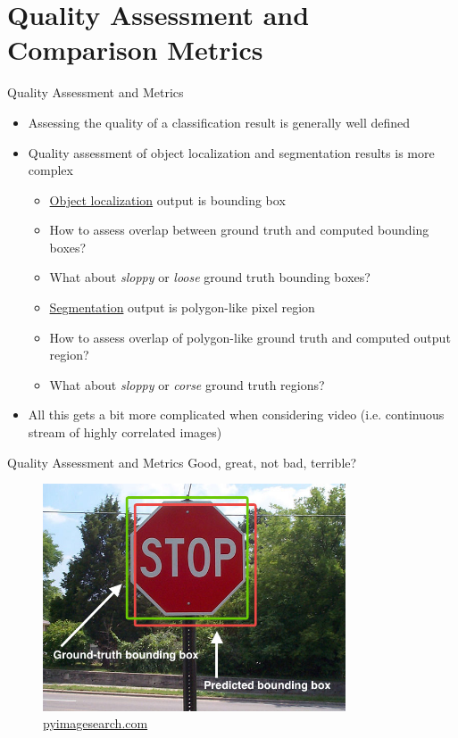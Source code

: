 \documentclass[handout]{beamer}
\begin{document}
\section{Quality Assessment and Comparison Metrics}
\begin{frame}{Quality Assessment and Metrics}
\begin{itemize}
\itemsep 1.25em
	\item<1->Assessing the quality of a classification result is generally well defined
	\item<2->Quality assessment of object localization and segmentation results is more complex
	\begin{itemize}[square]
		\item<1->\underline{Object localization} output is bounding box
		\item<2->How to assess overlap between ground truth and computed bounding boxes?
		\item<3->What about \emph{sloppy} or \emph{loose} ground truth bounding boxes?
	\end{itemize}
	
	\begin{itemize}[square]
		\item<4->\underline{Segmentation} output is polygon-like pixel region
		\item<5->How to assess overlap of polygon-like ground truth and computed output region?
		\item<6->What about \emph{sloppy} or \emph{corse} ground truth regions?
	\end{itemize}
	\item<3->All this gets a bit more complicated when considering video (i.e. continuous stream of highly correlated images)
\end{itemize}
\end{frame}

\begin{frame}{Quality Assessment and Metrics}
Good, great, not bad, terrible?
\begin{figure}
\centering
\includegraphics[width=0.8\textwidth]{../media/iou_stop_sign.jpg}
\caption{\href{http://www.pyimagesearch.com/2016/11/07/intersection-over-union-iou-for-object-detection/}{\color{blue}pyimagesearch.com}}
\end{figure}
\end{frame}
\end{document}
